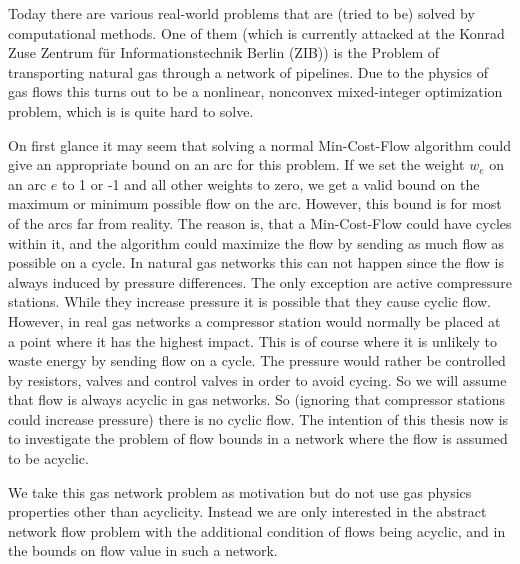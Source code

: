 
Today there are various real-world problems that are (tried to be) solved by computational methods. One of them (which 
is currently attacked at the Konrad Zuse Zentrum für Informationstechnik Berlin (ZIB)) is the Problem of transporting 
natural gas through a network of pipelines. Due to the physics of gas flows this turns out to be a nonlinear, nonconvex 
mixed-integer optimization problem, which is is quite hard to solve. 

On first glance it may seem that solving a normal Min-Cost-Flow algorithm could give an appropriate bound 
on an arc for this problem. If we set the weight $w_e$ on an arc $e$ to 1 or -1 and all other weights to zero, we get 
a valid bound on the maximum or minimum possible flow on the arc. However, this bound is for most of the arcs far from 
reality. The reason is, that a Min-Cost-Flow could have cycles within it, and the algorithm could maximize the flow by 
sending as much flow as possible on a cycle. In natural gas networks this can not happen since the flow is 
always induced by pressure differences. The only exception are active compressure stations. While they increase 
pressure it is possible that they cause cyclic flow. However, in real gas networks a compressor station would normally 
be placed at a point where it has the highest impact. This is of course where it is unlikely to waste energy by sending 
flow on a cycle. The pressure would rather be controlled by resistors, valves and control valves in order to avoid 
cycing. So we will assume that flow is always acyclic in gas networks.
So (ignoring that compressor stations could increase pressure) there is no cyclic flow. The intention of this thesis now 
is to investigate the problem of flow bounds in a network where the flow is assumed to be acyclic. 

We take this gas network problem as motivation but do not use gas physics properties other than acyclicity. Instead we 
are only interested in the abstract network flow problem with the additional condition of flows being acyclic, and 
in the bounds on flow value in such a network. 

